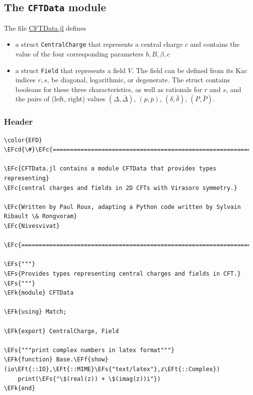 \documentclass[a4paper]{article}
\numberwithin{equation}{section}
\newcommand{\EFc}[1]{\textcolor{EFc}{#1}} %
\newcommand{\EFcd}[1]{\textcolor{EFcd}{#1}} %
\newcommand{\EFs}[1]{\textcolor{EFs}{#1}} %
\newcommand{\EFk}[1]{\textcolor{EFk}{#1}} %
\newcommand{\EFf}[1]{\textcolor{EFf}{#1}} %
\newcommand{\EFt}[1]{\textcolor{EFt}{#1}} %
\begin{document}
\subsection{The \texttt{CFTData} module}
\label{sec:orgdc7d2a3}
The file \href{src/CFTData.jl}{CFTData.jl} defines
\begin{itemize}
\item a struct \texttt{CentralCharge} that represents a central charge \(c\) and contains the value of the four corresponding parameters \(b, B, \beta, c\)
\item a struct \texttt{Field} that represents a field \(V\). The field can be defined from its Kac indices \(r, s\), be diagonal, logarithmic, or degenerate. The struct contains booleans for these three characteristics, as well as rationals for \(r\) and \(s\), and the pairs of (left, right) values \((\Delta, \bar \Delta)\), \((p, \bar p)\), \((\delta, \bar \delta)\), \((P, \bar P)\).
\end{itemize}
\subsubsection*{Header}
\label{sec:org43e5117}

\begin{Code}
\begin{Verbatim}
\color{EFD}
\EFcd{\#}\EFc{===========================================================================================}

\EFc{CFTData.jl contains a module CFTData that provides types representing}
\EFc{central charges and fields in 2D CFTs with Virasoro symmetry.}

\EFc{Written by Paul Roux, adapting a Python code written by Sylvain Ribault \& Rongvoram}
\EFc{Nivesvivat}

\EFc{============================================================================================\#}

\EFs{"""}
\EFs{Provides types representing central charges and fields in CFT.}
\EFs{"""}
\EFk{module} CFTData

\EFk{using} Match;

\EFk{export} CentralCharge, Field

\EFs{"""print complex numbers in latex format"""}
\EFk{function} Base.\EFf{show}(io\EFt{::IO},\EFt{::MIME}\EFs{"text/latex"},z\EFt{::Complex})
    print(\EFs{"\$(real(z)) + \$(imag(z))i"})
\EFk{end}

\end{Verbatim}
\end{Code}
\end{document}
